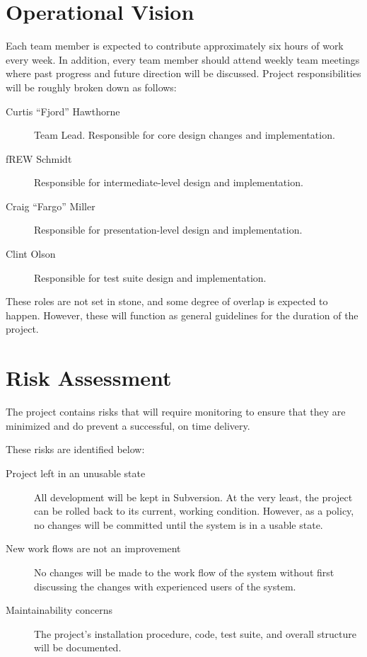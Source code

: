 \documentclass[12pt,titlepage]{article}
\begin{document}
\section{Operational Vision}
Each team member is expected to contribute approximately six hours of work every week.  In addition, every team member should attend weekly team meetings where past progress and future direction will be discussed.  Project responsibilities will be roughly broken down as follows:
\begin{description}
	\item[Curtis ``Fjord'' Hawthorne] Team Lead.  Responsible for core design changes and implementation.
	\item[fREW Schmidt] Responsible for intermediate-level design and implementation.
	\item[Craig ``Fargo'' Miller] Responsible for presentation-level design and implementation.
	\item[Clint Olson] Responsible for test suite design and implementation.
\end{description}
These roles are not set in stone, and some degree of overlap is expected to happen.  However, these will function as general guidelines for the duration of the project.
\section{Risk Assessment}
The project contains risks that will require monitoring to ensure that they are minimized and do prevent a successful, on time delivery.

These risks are identified below:
\begin{description}
	\item[Project left in an unusable state] All development will be kept in Subversion.  At the very least, the project can be rolled back to its current, working condition.  However, as a policy, no changes will be committed until the system is in a usable state.
	\item[New work flows are not an improvement] No changes will be made to the work flow of the system without first discussing the changes with experienced users of the system.
	\item[Maintainability concerns] The project's installation procedure, code, test suite, and overall structure will be documented.
\end{description}
\end{document}
